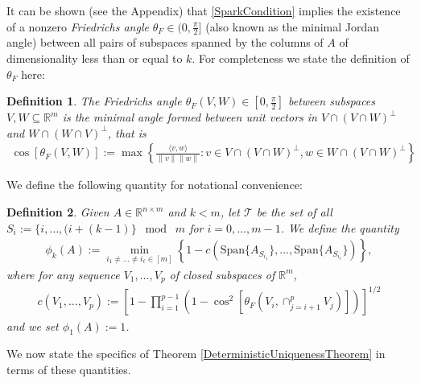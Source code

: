 \documentclass[journal, onecolumn]{IEEEtran}
\newtheorem{definition}{Definition}
\begin{document}
It can be shown (see the Appendix) that \eqref{SparkCondition} implies the existence of a nonzero \emph{Friedrichs angle} $\theta_F \in (0,\frac{\pi}{2}]$ (also known as the minimal Jordan angle) between all pairs of subspaces spanned by the columns of $A$ of dimensionality less than or equal to $k$. For completeness we state the definition of $\theta_F$ here:

\begin{definition}\label{FriedrichsDefinition}
The \emph{Friedrichs angle} $\theta_F(V,W) \in [0,\frac{\pi}{2}]$ between subspaces $V,W \subseteq \mathbb{R}^m$ is the minimal angle formed between unit vectors in $V \cap (V \cap W)^\perp$ and $W \cap (W \cap V)^\perp$, that is
\begin{align}
\cos\left[\theta_F(V,W)\right] := \max\left\{ \frac{ \langle v, w \rangle }{\|v\|\|w\|}: v \in V \cap (V \cap W)^\perp, w \in W \cap (V \cap W)^\perp \right\}
\end{align}
\end{definition}

We define the following quantity for notational convenience:

\begin{definition}\label{SpecialSupportSet}
Given $A \in \mathbb{R}^{n \times m}$ and $k < m$, let $\mathcal{T}$ be the set of all $S_i := \{i, \ldots, (i + (k-1) \} \;\bmod\; m$ for $i = 0, \ldots, m-1$. We define the quantity
\begin{align}\label{rho}
\phi_k(A) := \min_{ i_1 \neq \ldots \neq i_{\ell} \in [m]} \left\{ 1 - c(\text{Span}\{A_{S_{i_1}}\}, \ldots, \text{Span}\{A_{S_{i_\ell}}\}) \right\},
\end{align}
where for any sequence $V_1, \ldots, V_p$ of closed subspaces of $\mathbb{R}^m$,
\begin{align}
c(V_1, \ldots, V_p) := \left[1 - \prod_{i=1}^{p-1} \left(1 - \cos^2\left[ \theta_F(V_i, \cap_{j=i+1}^p V_j) \right] \right) \right]^{1/2} 
\end{align}
%
and we set $\phi_1(A) := 1$.
\end{definition}

We now state the specifics of Theorem \ref{DeterministicUniquenessTheorem} in terms of these quantities.

\end{document}
